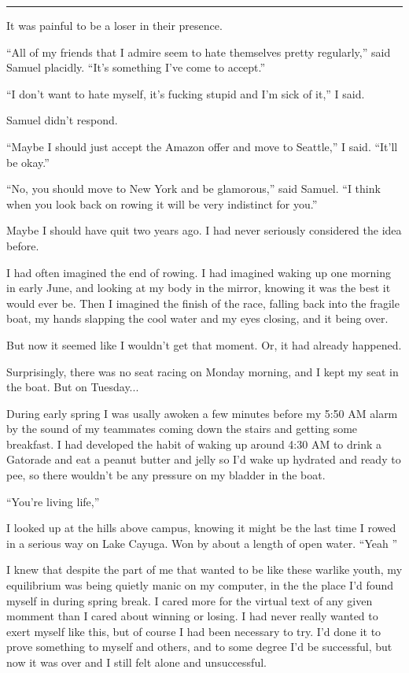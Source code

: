 \plainfancybreak{12pt}{2}{* * *}

It was painful to be a loser in their presence.  

``All of my friends that I admire seem to hate themselves pretty regularly,''
said Samuel placidly.  ``It's something I've come to accept.''

``I don't want to hate myself, it's fucking stupid and I'm sick of it,'' I said.  

Samuel didn't respond.

``Maybe I should just accept the Amazon offer and move to Seattle,'' I said.
``It'll be okay.''

``No, you should move to New York and be glamorous,'' said Samuel.  ``I think
when you look back on rowing it will be very indistinct for you.'' 

Maybe I should have quit two years ago.  I had never seriously considered the
idea before.

I had often imagined the end of rowing.  I had imagined waking up one morning in
early June, and looking at my body in the mirror, knowing it was the best it
would ever be.  Then I imagined  the finish of the race, falling back into the
fragile boat, my hands slapping the cool water and my eyes closing, and it being
over.

But now it seemed like I wouldn't get that moment.  Or, it had already happened.

Surprisingly, there was no seat racing on Monday morning, and I kept my seat in
the boat.  But on Tuesday...

During early spring I was usally awoken a few minutes before my 5:50 AM alarm by
the sound of my teammates coming down the stairs and getting some breakfast.  I
had developed the habit of waking up around 4:30 AM to drink a Gatorade and eat
a peanut butter and jelly so I'd wake up hydrated and ready to pee, so there
wouldn't be any pressure on my bladder in the boat. 

``You're living life,''

I looked up at the hills above campus, knowing it might be the last time I rowed
in a serious way on Lake Cayuga.  Won by about a length of open water.  ``Yeah
'' 

I knew that despite the part of me that wanted to be like these warlike youth,
my equilibrium was being quietly manic on my computer, in the the place I'd
found myself in during spring break.  I cared more for the virtual text of any
given momment than I cared about winning or losing.  I had never really wanted
to exert myself like this, but of course I had been necessary to try.  I'd done
it to prove something to myself and others, and to some degree I'd be
successful, but now it was over and I still felt alone and unsuccessful.

